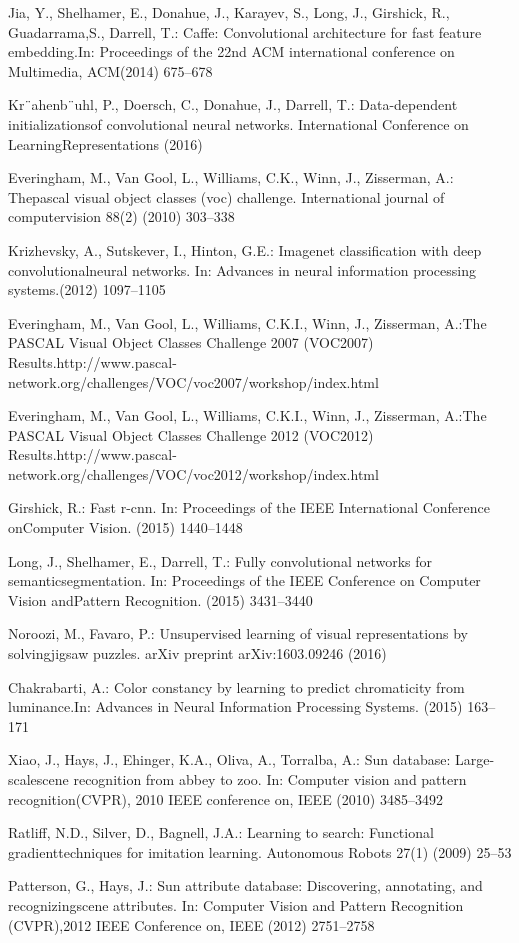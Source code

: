 \begin{translationbib}
\item Jia, Y., Shelhamer, E., Donahue, J., Karayev, S., Long, J., Girshick, R., Guadarrama,S., Darrell, T.: Caffe: Convolutional architecture for fast feature embedding.In: Proceedings of the 22nd ACM international conference on Multimedia, ACM(2014) 675–678
\item Kr¨ahenb¨uhl, P., Doersch, C., Donahue, J., Darrell, T.: Data-dependent initializationsof convolutional neural networks. International Conference on LearningRepresentations (2016)
\item Everingham, M., Van Gool, L., Williams, C.K., Winn, J., Zisserman, A.: Thepascal visual object classes (voc) challenge. International journal of computervision 88(2) (2010) 303–338
\item Krizhevsky, A., Sutskever, I., Hinton, G.E.: Imagenet classification with deep convolutionalneural networks. In: Advances in neural information processing systems.(2012) 1097–1105
\item Everingham, M., Van Gool, L., Williams, C.K.I., Winn, J., Zisserman, A.:The PASCAL Visual Object Classes Challenge 2007 (VOC2007) Results.http://www.pascal-network.org/challenges/VOC/voc2007/workshop/index.html
\item Everingham, M., Van Gool, L., Williams, C.K.I., Winn, J., Zisserman, A.:The PASCAL Visual Object Classes Challenge 2012 (VOC2012) Results.http://www.pascal-network.org/challenges/VOC/voc2012/workshop/index.html
\item Girshick, R.: Fast r-cnn. In: Proceedings of the IEEE International Conference onComputer Vision. (2015) 1440–1448
\item Long, J., Shelhamer, E., Darrell, T.: Fully convolutional networks for semanticsegmentation. In: Proceedings of the IEEE Conference on Computer Vision andPattern Recognition. (2015) 3431–3440
\item Noroozi, M., Favaro, P.: Unsupervised learning of visual representations by solvingjigsaw puzzles. arXiv preprint arXiv:1603.09246 (2016)
\item Chakrabarti, A.: Color constancy by learning to predict chromaticity from luminance.In: Advances in Neural Information Processing Systems. (2015) 163–171
\item Xiao, J., Hays, J., Ehinger, K.A., Oliva, A., Torralba, A.: Sun database: Large-scalescene recognition from abbey to zoo. In: Computer vision and pattern recognition(CVPR), 2010 IEEE conference on, IEEE (2010) 3485–3492
\item Ratliff, N.D., Silver, D., Bagnell, J.A.: Learning to search: Functional gradienttechniques for imitation learning. Autonomous Robots 27(1) (2009) 25–53
\item Patterson, G., Hays, J.: Sun attribute database: Discovering, annotating, and recognizingscene attributes. In: Computer Vision and Pattern Recognition (CVPR),2012 IEEE Conference on, IEEE (2012) 2751–2758
\end{translationbib}
